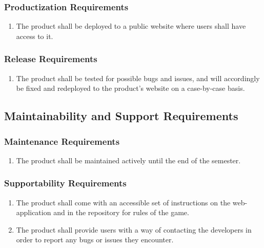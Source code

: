 \documentclass[]{article}
\begin{document}
\subsubsection{Productization Requirements}
\label{ssub:productization_requirements}
\begin{enumerate}[{OE}1., leftmargin=2\parindent, resume]
	\item The product shall be deployed to a public website where users shall have access to it.
\end{enumerate}

\subsubsection{Release Requirements}
\label{ssub:release_requirements}
\begin{enumerate}[{OE}1., leftmargin=2\parindent, resume]
	\item The product shall be tested for possible bugs and issues, and will accordingly be fixed and redeployed to the product's website on a case-by-case basis. 
\end{enumerate}


\subsection{Maintainability and Support Requirements}
\label{sub:maintainability_and_support_requirements}

\subsubsection{Maintenance Requirements}
\label{ssub:maintenance_requirements}
\begin{enumerate}[{MS}1., leftmargin=2\parindent]
	\item The product shall be maintained actively until the end of the semester.
\end{enumerate}

\subsubsection{Supportability Requirements}
\label{ssub:supportability_requirements}
\begin{enumerate}[{MS}1., leftmargin=2\parindent, resume]
    \item The product shall come with an accessible set of instructions on the web-application and in the repository for rules of the game.
    \item The product shall provide users with a way of contacting the developers in order to report any bugs or issues they encounter.
\end{enumerate}
\end{document}

